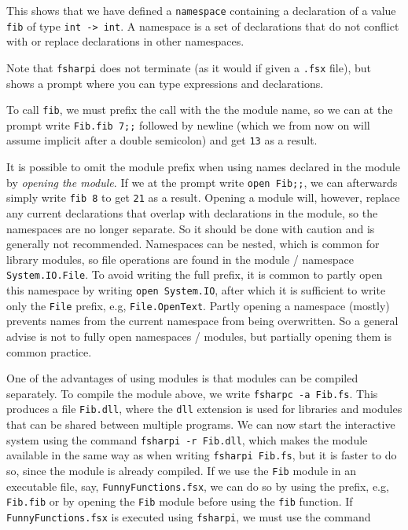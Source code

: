 \documentclass[a4paper]{article}
\begin{document}
\noindent
This shows that we have defined a \texttt{namespace} containing a
declaration of a value \texttt{fib} of type \texttt{int -> int}.  A
namespace is a set of declarations that do not conflict with or
replace declarations in other namespaces.

Note that \texttt{fsharpi} does not terminate (as it would if given a
\texttt{.fsx} file), but shows a prompt where you can type expressions
and declarations.

To call \texttt{fib}, we must prefix the call with the the module
name, so we can at the prompt write \texttt{Fib.fib 7;;} followed by
newline (which we from now on will assume implicit after a double
semicolon) and get \texttt{13} as a result.

It is possible to omit the module prefix when using names declared in
the module by \emph{opening the module}.  If we at the prompt write
\texttt{open Fib;;}, we can afterwards simply write \texttt{fib 8} to
get \texttt{21} as a result.  Opening a module will, however, replace
any current declarations that overlap with declarations in the module,
so the namespaces are no longer separate.  So it should be done with
caution and is generally not recommended.  Namespaces can be nested,
which is common for library modules, so file operations are found in
the module / namespace \texttt{System.IO.File}.  To avoid writing the
full prefix, it is common to partly open this namespace by writing
\texttt{open System.IO}, after which it is sufficient to write only
the \texttt{File} prefix, e.g, \texttt{File.OpenText}.  Partly opening
a namespace (mostly) prevents names from the current namespace from
being overwritten.  So a general advise is not to fully open
namespaces / modules, but partially opening them is common practice.

One of the advantages of using modules is that modules can be compiled
separately.  To compile the module above, we write \texttt{fsharpc -a
  Fib.fs}.  This produces a file \texttt{Fib.dll}, where the
\texttt{dll} extension is used for libraries and modules that can be
shared between multiple programs.  We can now start the interactive
system using the command \texttt{fsharpi -r Fib.dll}, which makes the
module available in the same way as when writing \texttt{fsharpi
  Fib.fs}, but it is faster to do so, since the module is already
compiled.  If we use the \texttt{Fib} module in an executable file,
say, \texttt{FunnyFunctions.fsx}, we can do so by using the prefix,
e.g, \texttt{Fib.fib} or by opening the \texttt{Fib} module before
using the \texttt{fib} function.  If \texttt{FunnyFunctions.fsx} is
executed using \texttt{fsharpi}, we must use the command
\end{document}
